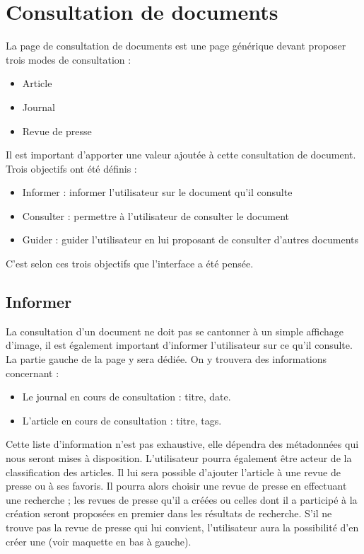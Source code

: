 \section{Consultation de documents}
\label{sec:consultation}

La page de consultation de documents est une page générique devant proposer trois modes de consultation :
\begin{itemize}
\item Article
\item Journal
\item Revue de presse
\end{itemize}

Il est important d’apporter une valeur ajoutée à cette consultation de document. Trois objectifs ont été définis :
\begin{itemize}
\item Informer : informer l’utilisateur sur le document qu’il consulte
\item Consulter : permettre à l’utilisateur de consulter le document
\item Guider : guider l’utilisateur en lui proposant de consulter d’autres documents
\end{itemize}
C’est selon ces trois objectifs que l’interface a été pensée.


\subsection{Informer}
\label{sec:consultation_informer}
	La consultation d’un document ne doit pas se cantonner à un simple affichage d’image, il est également important d’informer l’utilisateur sur ce qu’il consulte. La partie gauche de la page y sera dédiée.
On y trouvera des informations concernant :
\begin{itemize}
\item Le journal en cours de consultation : titre, date.
\item L’article en cours de consultation : titre, tags.
\end{itemize}
	Cette liste d’information n’est pas exhaustive, elle dépendra des métadonnées qui nous seront mises à disposition.
	L’utilisateur pourra également être acteur de la classification des articles. Il lui sera possible d’ajouter l’article à une revue de presse ou à ses favoris. Il pourra alors choisir une revue de presse en effectuant une recherche ; les revues de presse qu’il a créées ou celles dont il a participé à la création seront proposées en premier dans les résultats de recherche. S’il ne trouve pas la revue de presse qui lui convient, l’utilisateur aura la possibilité d’en créer une (voir maquette en bas à gauche).

